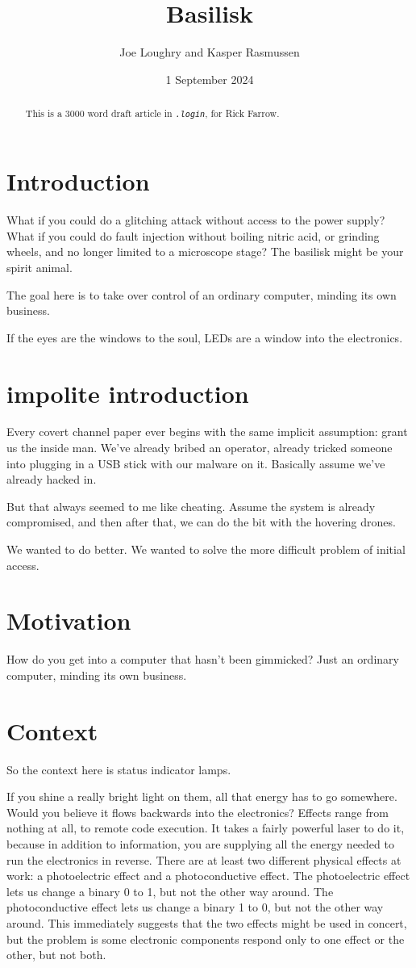 \documentclass[letterpaper]{article}
\date{1 September 2024}
\title{Basilisk}
\author{Joe Loughry and Kasper Rasmussen}
\begin{document}
\maketitle
\begin{abstract}
This is a 3000 word draft article in \emph{\texttt{.login}}, for Rick Farrow.
\end{abstract}
\section{Introduction}
What if you could do a glitching attack without access to the power supply?
What if you could do fault injection without boiling nitric acid, or grinding
wheels, and no longer limited to a microscope stage? The basilisk might be your
spirit animal.

The goal here is to take over control of an ordinary computer, minding its own
business.

If the eyes are the windows to the soul, LEDs are a window into the electronics.
\section{impolite introduction}
Every covert channel paper ever begins with the same implicit assumption: grant
us the inside man. We've already bribed an operator, already tricked someone
into plugging in a USB stick with our malware on it. Basically assume we've
already hacked in.

But that always seemed to me like cheating. Assume the system is already
compromised, and then after that, we can do the bit with the hovering drones.

We wanted to do better. We wanted to solve the more difficult problem of
initial access.
\section{Motivation}
How do you get into a computer that hasn't been gimmicked? Just an ordinary
computer, minding its own business.
\section{Context}
So the context here is status indicator lamps.

If you shine a really bright light on them, all that energy has to go
somewhere. Would you believe it flows backwards into the electronics? Effects
range from nothing at all, to remote code execution. It takes a fairly powerful
laser to do it, because in addition to information, you are supplying all the
energy needed to run the electronics in reverse. There are at least two
different physical effects at work: a photoelectric effect and a
photoconductive effect. The photoelectric effect lets us change a binary 0 to
1, but not the other way around. The photoconductive effect lets us change a
binary 1 to 0, but not the other way around. This immediately suggests that the
two effects might be used in concert, but the problem is some electronic
components respond only to one effect or the other, but not both.
\end{document}
